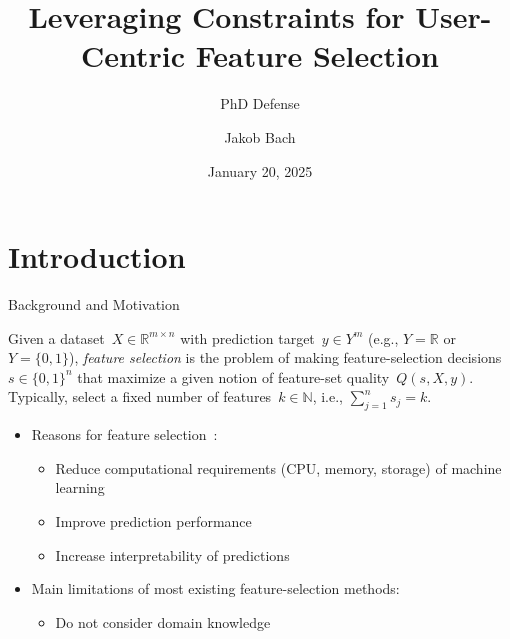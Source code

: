 \documentclass[en, navbarinline, handout]{sdqbeamer}
\title[Leveraging Constraints for User-Centric Feature Selection]{Leveraging Constraints for User-Centric Feature Selection} %
\subtitle{PhD Defense}
\author[Jakob Bach]{Jakob Bach} %
\date[2025-01-20]{January 20, 2025} %
\begin{document}
\KITtitleframe

\section{Introduction}

\begin{frame}[t]{Background and Motivation}
	\begin{definition}
		Given a dataset~$X \in \mathbb{R}^{m \times n}$
		with prediction target~$y \in Y^m$ (e.g., $Y = \mathbb{R}$ or $Y = \{0, 1\}$),
		\emph{feature selection} is the problem of making feature-selection decisions~$s \in \{0,1\}^n$
		that maximize a given notion of feature-set quality~$Q(s,X,y)$.
		Typically, select a fixed number of features~$k \in \mathbb{N}$, i.e., $\sum_{j=1}^n s_j = k$.
	\end{definition}
	\pause
	\vspace{\baselineskip}
	\begin{itemize}
		\item Reasons for feature selection~\cite{chandrashekar2014survey, li2017feature}:
		\begin{itemize}
			\item Reduce computational requirements (CPU, memory, storage) of machine learning
			\item Improve prediction performance
			\item Increase interpretability of predictions
		\end{itemize}
		\pause
		\vspace{\baselineskip}
		\item Main limitations of most existing feature-selection methods:
		\begin{itemize}
			\item Do not consider domain knowledge

\end{itemize}
\end{itemize}
\end{frame}
\end{document}
